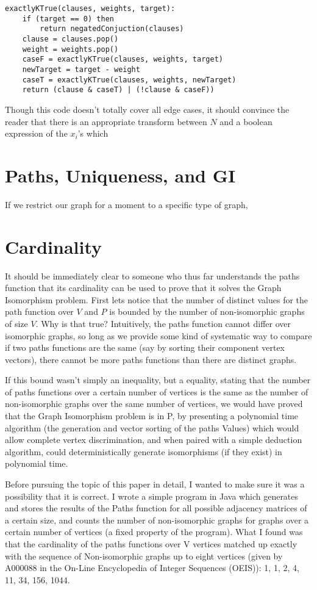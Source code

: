 \documentclass[a4paper,12pt]{article}
\begin{document}
\begin{lstlisting}[frame=single]
exactlyKTrue(clauses, weights, target):
	if (target == 0) then
		return negatedConjuction(clauses)
	clause = clauses.pop()
	weight = weights.pop()
	caseF = exactlyKTrue(clauses, weights, target)
	newTarget = target - weight
	caseT = exactlyKTrue(clauses, weights, newTarget)
	return (clause & caseT) | (!clause & caseF))
\end{lstlisting}

Though this code doesn't totally cover all edge cases, it should convince the reader that there is an appropriate transform between \(N\) and a boolean expression of the \(x_i\)'s which 
 
\section{Paths, Uniqueness, and GI}

If we restrict our graph for a moment to a specific type of graph, 

\section{Cardinality}

It should be immediately clear to someone who thus far understands the paths function that its cardinality can be used to prove that it solves the Graph Isomorphism problem.  First lets notice that the number of distinct values for the path function over \(V\) and \(P\) is bounded by the number of non-isomorphic graphs of size \(V\).  Why is that true? Intuitively, the paths function cannot differ over isomorphic graphs, so long as we provide some kind of systematic way to compare if two paths functions are the same (say by sorting their component vertex vectors), there cannot be more paths functions than there are distinct graphs.

If this bound wasn't simply an inequality, but a equality, stating that the number of paths functions over a certain number of vertices is the same as the number of non-isomorphic graphs over the same number of vertices, we would have proved that the Graph Isomorphism problem is in P, by presenting a polynomial time algorithm (the generation and vector sorting of the paths Values) which would allow complete vertex discrimination, and when paired with a simple deduction algorithm, could deterministically generate isomorphisms (if they exist) in polynomial time. 

Before pursuing the topic of this paper in detail, I wanted to make sure it was a possibility that it is correct.  I wrote a simple program in Java which generates and stores the results of the Paths function for all possible adjacency matrices of a certain size, and counts the number of non-isomorphic graphs for graphs over a certain number of vertices (a fixed property of the program). What I found was that the cardinality of the paths functions over V vertices matched up exactly with the sequence of Non-isomorphic graphs up to eight vertices (given by A000088 in the On-Line Encyclopedia of Integer Sequences (OEIS)): 1, 1, 2,  4, 11, 34, 156, 1044.
\end{document}
